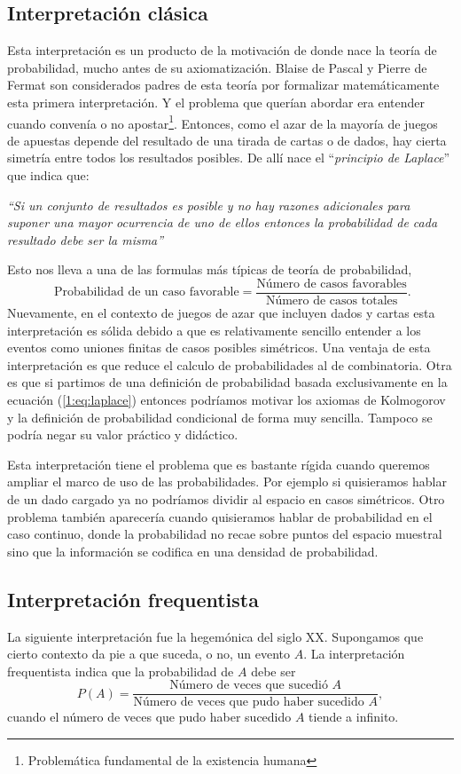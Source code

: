 \subsection{Interpretación clásica}
Esta interpretación es un producto de la motivación de donde nace la teoría de probabilidad, mucho antes de su axiomatización. Blaise de Pascal y Pierre de Fermat son considerados padres de esta teoría por formalizar matemáticamente esta primera interpretación. Y el problema que querían abordar era entender cuando convenía o no apostar\footnote{Problemática fundamental de la existencia humana}. Entonces, como el azar de la mayoría de juegos de apuestas depende del resultado de una tirada de cartas o de dados, hay cierta simetría entre todos los resultados posibles. De allí nace el ``{\it principio de Laplace}'' que indica que:
\begin{center}
    {\it
    ``Si un conjunto de resultados es posible y no hay razones adicionales para suponer una mayor ocurrencia de uno de ellos entonces la probabilidad de cada resultado debe ser la misma''
    }
\end{center}
Esto nos lleva a una de las formulas más típicas de teoría de probabilidad,
\begin{equation}
   \text{ Probabilidad de un caso favorable} = \frac{{\text{Número de casos favorables}}}{\text{Número de casos totales}}.
   \label{1:eq:fav}
\end{equation}
Nuevamente, en el contexto de juegos de azar que incluyen dados y cartas esta interpretación es sólida debido a que es relativamente sencillo entender a los eventos como uniones finitas de casos posibles simétricos. Una ventaja de esta interpretación es que reduce el calculo de probabilidades al de combinatoria. Otra es que si partimos de una definición de probabilidad basada exclusivamente en la ecuación (\ref{1:eq:laplace}) entonces podríamos motivar los axiomas de Kolmogorov y la definición de probabilidad condicional de forma muy sencilla. Tampoco se podría negar su valor práctico y didáctico.

Esta interpretación tiene el problema que es bastante rígida cuando queremos ampliar el marco de uso de las probabilidades. Por ejemplo si quisieramos hablar de un dado cargado ya no podríamos dividir al espacio en casos simétricos. Otro problema también aparecería cuando quisieramos hablar de probabilidad en el caso continuo, donde la probabilidad no recae sobre puntos del espacio muestral sino que la información se codifica en una densidad de probabilidad.
\subsection{Interpretación frequentista}
La siguiente interpretación fue la hegemónica del siglo XX. Supongamos que cierto contexto da pie a que suceda, o no, un evento $A$. La interpretación frequentista indica que la probabilidad de $A$ debe ser
\begin{equation}
    P(A) = \frac{\text{Número de veces que sucedió $A$}}{\text{Número de veces que pudo haber sucedido $A$}},
\end{equation}
cuando el número de veces que pudo haber sucedido $A$ tiende a infinito.

